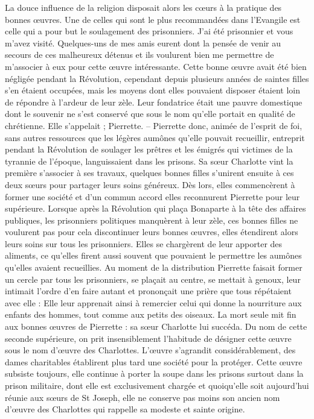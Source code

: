 \documentclass[11pt,a4paper]{report}
\begin{document}
La douce influence de la religion disposait alors les cœurs à la pratique des bonnes œuvres. Une de celles qui sont le plus recommandées dans l'Evangile est celle qui a pour but le soulagement des prisonniers. J'ai été prisonnier et vous m'avez visité. Quelques-uns de mes amis eurent dont la pensée de venir au secours de ces malheureux détenus et ils voulurent bien me permettre de m'associer à eux pour cette œuvre intéressante. Cette bonne œuvre avait été bien négligée pendant la Révolution, cependant depuis plusieurs années de saintes filles s'en étaient occupées, mais les moyens dont elles pouvaient disposer étaient loin de répondre à l'ardeur de leur zèle. Leur fondatrice était une pauvre domestique dont le souvenir ne s'est conservé que sous le nom qu'elle portait en qualité de chrétienne. Elle s'appelait ; Pierrette. -- Pierrette donc, animée de l'esprit de foi, sans autres ressources que les légères aumônes qu'elle pouvait recueillir, entreprit pendant la Révolution de soulager les prêtres et les émigrés qui victimes de la tyrannie de l'époque, languissaient dans les prisons. Sa sœur Charlotte vint la première s'associer à ses travaux, quelques bonnes filles s'unirent ensuite à ces deux sœurs pour partager leurs soins généreux. Dès lors, elles commencèrent à former une société et d'un commun accord elles reconnurent Pierrette pour leur supérieure. Lorsque après la Révolution qui plaça Bonaparte à la tête des affaires publiques, les prisonniers politiques manquèrent à leur zèle, ces bonnes filles ne voulurent pas pour cela discontinuer leurs bonnes œuvres, elles étendirent alors leurs soins sur tous les prisonniers. Elles se chargèrent de leur apporter des aliments, ce qu'elles firent aussi souvent que pouvaient le permettre les aumônes qu'elles avaient recueillies. Au moment de la distribution Pierrette faisait former un cercle par tous les prisonniers, se plaçait au centre, se mettait à genoux, leur intimait l'ordre d'en faire autant et prononçait une prière que tous répétaient avec elle : Elle leur apprenait ainsi à remercier celui qui donne la nourriture aux enfants des hommes, tout comme aux petits des oiseaux. La mort seule mit fin aux bonnes œuvres de Pierrette : sa sœur Charlotte lui succéda. Du nom de cette seconde supérieure, on prit insensiblement l'habitude de désigner cette œuvre sous le nom d'œuvre des Charlottes. L'œuvre s'agrandit considérablement, des dames charitables établirent plus tard une société pour la protéger. Cette œuvre subsiste toujours, elle continue à porter la soupe dans les prisons surtout dans la prison militaire, dont elle est exclusivement chargée et quoiqu'elle soit aujourd'hui réunie aux sœurs de St Joseph, elle ne conserve pas moins son ancien nom d'œuvre des Charlottes qui rappelle sa modeste et sainte origine.
\end{document}
